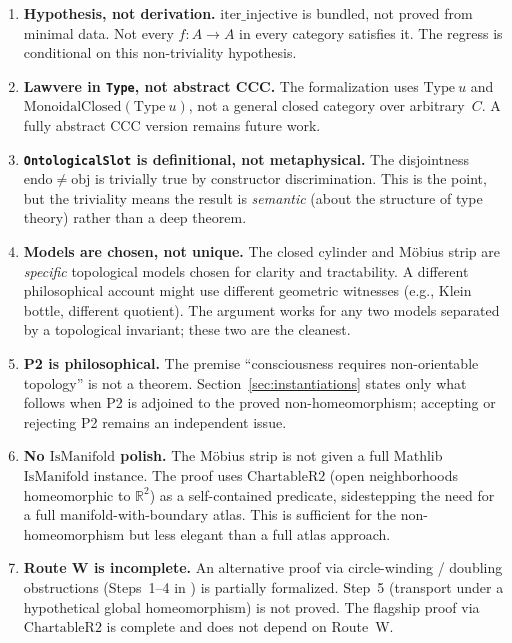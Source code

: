 \documentclass[11pt]{article}
\begin{document}
\begin{enumerate}
\item \textbf{Hypothesis, not derivation.} $\mathrm{iter\_injective}$ is bundled,
  not proved from minimal data. Not every $f : A \to A$ in every category satisfies it.
  The regress is conditional on this non-triviality hypothesis.

\item \textbf{Lawvere in \texttt{Type}, not abstract CCC.} The formalization uses
  $\mathrm{Type}\ u$ and\newline
  $\mathrm{MonoidalClosed}(\mathrm{Type}\ u)$, not a general closed category over arbitrary~$C$.
  A fully abstract CCC version remains future work.

\item \textbf{\texttt{OntologicalSlot} is definitional, not metaphysical.} The disjointness $\mathrm{endo} \neq \mathrm{obj}$ is trivially true by constructor discrimination. This is the point, but the triviality means the result is \emph{semantic} (about the structure of type theory) rather than a deep theorem.

\item \textbf{Models are chosen, not unique.} The closed cylinder and M\"obius strip are \emph{specific} topological models chosen for clarity and tractability. A different philosophical account might use different geometric witnesses (e.g., Klein bottle, different quotient). The argument works for any two models separated by a topological invariant; these two are the cleanest.

\item \textbf{P2 is philosophical.} The premise ``consciousness requires non-orientable topology'' is not a theorem. Section~\ref{sec:instantiations} states only what follows when P2 is adjoined to the proved non-homeomorphism; accepting or rejecting P2 remains an independent issue.

\item \textbf{No $\mathrm{IsManifold}$ polish.} The M\"obius strip is not given a full Mathlib $\mathrm{IsManifold}$ instance. The proof uses $\mathrm{ChartableR2}$ (open neighborhoods homeomorphic to $\mathbb{R}^2$) as a self-contained predicate, sidestepping the need for a full manifold-with-boundary atlas. This is sufficient for the non-homeomorphism but less elegant than a full atlas approach.

\item \textbf{Route W is incomplete.} An alternative proof via circle-winding / doubling obstructions (Steps~1--4 in ) is partially formalized. Step~5 (transport under a hypothetical global homeomorphism) is not proved. The flagship proof via $\mathrm{ChartableR2}$ is complete and does not depend on Route~W.


\end{enumerate}
\end{document}
